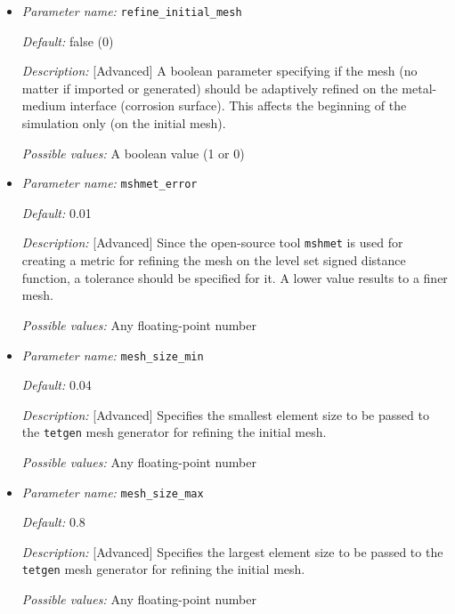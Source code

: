 \begin{itemize}
{\it Description:} [Standard] Number of elements on each edge of the container box, so a higher number means a finer mesh. The mesh size of the cuboid will be adjusted accordingly or can be adaptively refined by setting parameter {\tt refine\_initial\_mesh} to TRUE.

{\it Possible values:} Any positive integer number


\item {\it Parameter name:} {\tt refine\_initial\_mesh}
\label{parameters:refine_initial_mesh}


{\it Default:} false (0)

{\it Description:} [Advanced] A boolean parameter specifying if the mesh (no matter if imported or generated) should be adaptively refined on the metal-medium interface (corrosion surface). This affects the beginning of the simulation only (on the initial mesh).

{\it Possible values:} A boolean value (1 or 0)


\item {\it Parameter name:} {\tt mshmet\_error}
\label{parameters:mshmet_error}


{\it Default:} 0.01

{\it Description:} [Advanced] Since the open-source tool {\tt mshmet} is used for creating a metric for refining the mesh on the level set signed distance function, a tolerance should be specified for it. A lower value results to a finer mesh.

{\it Possible values:} Any floating-point number


\item {\it Parameter name:} {\tt mesh\_size\_min}
\label{parameters:mesh_size_min}


{\it Default:} 0.04

{\it Description:} [Advanced] Specifies the smallest element size to be passed to the {\tt tetgen} mesh generator for refining the initial mesh.

{\it Possible values:} Any floating-point number


\item {\it Parameter name:} {\tt mesh\_size\_max}
\label{parameters:mesh_size_max}


{\it Default:} 0.8

{\it Description:} [Advanced] Specifies the largest element size to be passed to the {\tt tetgen} mesh generator for refining the initial mesh.

{\it Possible values:} Any floating-point number

\end{itemize}



